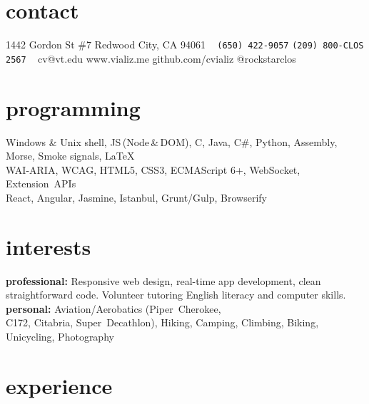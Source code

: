 \documentclass[]{cv-style}          %
\begin{document}
\lastupdated


\begin{aside}
%
\section{contact}
1442 Gordon St \#7
Redwood City, CA 94061
~
\texttt{\color{gray}(650) 422-9057}
\texttt{\color{gray}(209) 800-CLOS}
\texttt{\color{gray}          2567}
~
cv@vt.edu
www.vializ.me
github.com/cvializ
@rockstarclos
%
\section{programming}
Windows \& Unix shell, JS\,(Node\,\&\,DOM), C, Java, C\#, Python, Assembly, Morse, Smoke signals, \LaTeX{}%
\\[\baselineskip]%
WAI-ARIA, WCAG, HTML5, CSS3, ECMAScript 6+, WebSocket, {Extension~APIs}%
\\[\baselineskip]%
React, Angular, Jasmine, Istanbul, Grunt/Gulp, Browserify%
%
\section{interests}
\textbf{professional:} Responsive web design, real-time app development, clean straightforward code. Volunteer tutoring English literacy and computer skills.
\textbf{personal:} Aviation/Aerobatics ({Piper~Cherokee},\\{C172}, Citabria, {Super~Decathlon}), Hiking, Camping, Climbing, Biking, Unicycling, Photography
%
\end{aside}


\section{experience}
\end{document}
